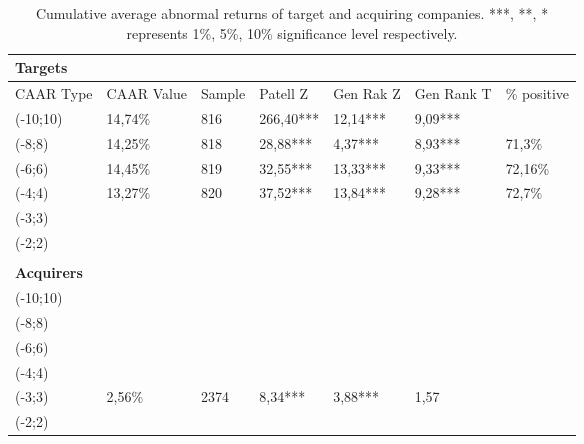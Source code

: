 \small
\begin{flushleft}

\begin{table}

  \begin{tabular}{p{2cm}p{}p{}p{}p{}p{}p{}}
  
\hline
\textbf{Targets}\\
\hline
CAAR Type &  CAAR Value & Sample & Patell Z & Gen Rak Z & Gen Rank T & \% positive\\
(-10;10) & 14,74\% & 816 & 266,40*** & 12,14*** & 9,09***\\
(-8;8) & 14,25\% & 818 & 28,88*** & 4,37*** & 8,93*** & 71,3\% \\
(-6;6) & 14,45\% & 819 & 32,55*** & 13,33*** & 9,33*** & 72,16\%\\
(-4;4) & 13,27\% & 820 & 37,52*** & 13,84*** & 9,28*** &  72,7\%\\
(-3;3) & \\
(-2;2) & \\
\\
\hline
\textbf{Acquirers}\\
\hline
(-10;10) & \\
(-8;8) & \\
(-6;6) & \\
(-4;4) & \\
(-3;3) & 2,56\% & 2374 & 8,34*** & 3,88*** & 1,57\\
(-2;2) & \\
\hline

\end{tabular}

  \caption{Cumulative average abnormal returns of target and acquiring companies. ***, **, * represents 1\%, 5\%, 10\% significance level respectively.}
  \label{table1}
\end{table}

\end{flushleft}